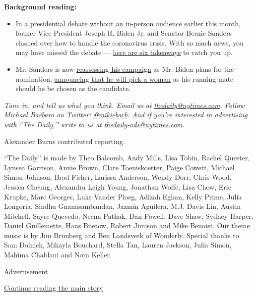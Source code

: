 \textbf{Background reading:}

\begin{itemize}
\item
  In
  \href{https://www.nytimes.com/2020/03/15/us/politics/biden-sanders-debate-recap.html}{a
  presidential debate without an in-person audience} earlier this month,
  former Vice President Joseph R. Biden Jr. and Senator Bernie Sanders
  clashed over how to handle the coronavirus crisis. With so much news,
  you may have missed the debate ---
  \href{https://www.nytimes.com/2020/03/16/us/politics/takeaways-march-democratic-debate.html}{here
  are six takeaways} to catch you up.
\item
  Mr. Sanders is now
  \href{https://www.nytimes.com/2020/03/21/us/politics/biden-sanders-coronavirus.html?searchResultPosition=9}{reassessing
  his campaign} as Mr. Biden plans for the nomination,
  \href{https://www.nytimes.com/2020/03/16/us/politics/joe-biden-vp-running-mate.html?searchResultPosition=10}{announcing
  that he will pick a woman} as his running mate should he be chosen as
  the candidate.
\end{itemize}

\emph{Tune in, and tell us what you think. Email us at}
\href{mailto:thedaily@nytimes.com}{\emph{thedaily@nytimes.com}}\emph{.
Follow Michael Barbaro on Twitter:}
\href{https://twitter.com/mikiebarb}{\emph{@mikiebarb}}\emph{. And if
you're interested in advertising with ``The Daily,'' write to us at}
\href{mailto:thedaily-ads@nytimes.com}{\emph{thedaily-ads@nytimes.com}}\emph{.}

Alexander Burns contributed reporting.

``The Daily'' is made by Theo Balcomb, Andy Mills, Lisa Tobin, Rachel
Quester, Lynsea Garrison, Annie Brown, Clare Toeniskoetter, Paige
Cowett, Michael Simon Johnson, Brad Fisher, Larissa Anderson, Wendy
Dorr, Chris Wood, Jessica Cheung, Alexandra Leigh Young, Jonathan Wolfe,
Lisa Chow, Eric Krupke, Marc Georges, Luke Vander Ploeg, Adizah Eghan,
Kelly Prime, Julia Longoria, Sindhu Gnanasambandan, Jazmín Aguilera,
M.J. Davis Lin, Austin Mitchell, Sayre Quevedo, Neena Pathak, Dan
Powell, Dave Shaw, Sydney Harper, Daniel Guillemette, Hans Buetow,
Robert Jimison and Mike Benoist. Our theme music is by Jim Brunberg and
Ben Landsverk of Wonderly. Special thanks to Sam Dolnick, Mikayla
Bouchard, Stella Tan, Lauren Jackson, Julia Simon, Mahima Chablani and
Nora Keller.

Advertisement

\protect\hyperlink{after-bottom}{Continue reading the main story}

